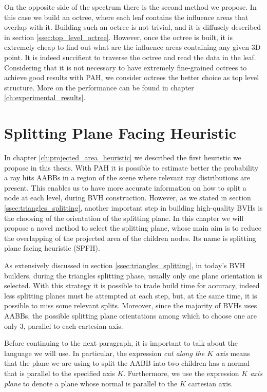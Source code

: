 \documentclass{PoliMi_MasterThesis}
\begin{document}
On the opposite side of the spectrum there is the second method we propose. In this case we build an octree, where each leaf contains the influence areas that overlap with it. Building such an octree is not trivial, and it is diffusely described in section \ref{ssec:top_level_octree}. However, once the octree is built, it is extremely cheap to find out what are the influence areas containing any given 3D point. It is indeed succifient to traverse the octree and read the data in the leaf. Considering that it is not necessary to have extremely fine-grained octrees to achieve good results with PAH, we consider octrees the better choice as top level structure. More on the performance can be found in chapter \ref{ch:experimental_results}.

\chapter{Splitting Plane Facing Heuristic} \label{ch:splitting_plane_facing_heuristic}
In chapter \ref{ch:projected_area_heuristic} we described the first heuristic we propose in this thesis. With PAH it is possible to estimate better the probability a ray hits AABBs in a region of the scene where relevant ray distributions are present. This enables us to have more accurate information on how to split a node at each level, during BVH construction. However, as we stated in section \ref{ssec:triangles_splitting}, another important step in building high-quality BVHs is the choosing of the orientation of the splitting plane. In this chapter we will propose a novel method to select the splitting plane, whose main aim is to reduce the overlapping of the projected area of the children nodes. Its name is splitting plane facing heuristic (SPFH).

As extensively discussed in section \ref{ssec:triangles_splitting}, in today's BVH builders, during the triangles splitting phase, usually only one plane orientation is selected. With this strategy it is possible to trade build time for accuracy, indeed less splitting planes must be attempted at each step, but, at the same time, it is possible to miss some relevant splits. Moreover, since the majority of BVHs uses AABBs, the possible splitting plane orientations among which to choose one are only 3, parallel to each cartesian axis.

Before continuing to the next paragraph, it is important to talk about the language we will use. In particular, the expression \textit{cut along the $K$ axis} means that the plane we are using to split the AABB into two children has a normal that is parallel to the specified axis $K$. Furthermore, we use the expression \textit{$K$ axis plane} to denote a plane whose normal is parallel to the $K$ cartesian axis.
\end{document}
